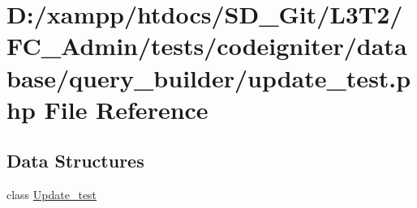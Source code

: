 \hypertarget{_admin_2tests_2codeigniter_2database_2query__builder_2update__test_8php}{}\section{D\+:/xampp/htdocs/\+S\+D\+\_\+\+Git/\+L3\+T2/\+F\+C\+\_\+\+Admin/tests/codeigniter/database/query\+\_\+builder/update\+\_\+test.php File Reference}
\label{_admin_2tests_2codeigniter_2database_2query__builder_2update__test_8php}
\subsection*{Data Structures}
\begin{DoxyCompactItemize}
\item 
class \hyperlink{class_update__test}{Update\+\_\+test}
\end{DoxyCompactItemize}
